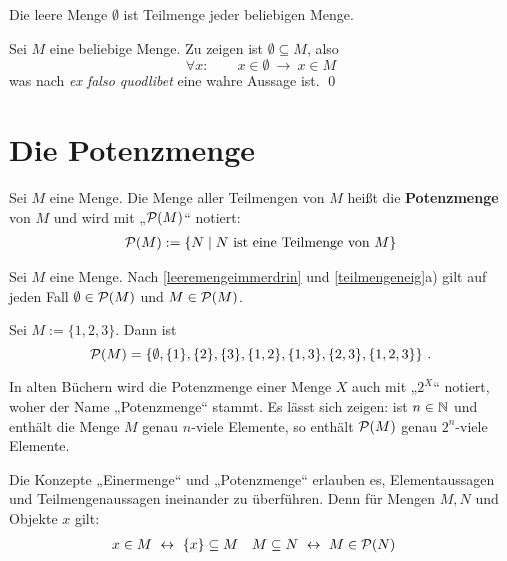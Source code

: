 \begin{satz} \label{leeremengeimmerdrin}
    Die leere Menge $\emptyset$ ist Teilmenge jeder beliebigen Menge.
\end{satz}


\begin{bew}
    Sei $M$ eine beliebige Menge. Zu zeigen ist $\emptyset\subseteq M$, also
        \[ \forall x:\qquad x\in \emptyset\ \to\ x\in M \]
    was nach \emph{ex falso quodlibet} eine wahre Aussage ist. \qed
\end{bew}





\section{Die Potenzmenge}


\begin{de}[Potenzmenge] \label{def:potenzmenge} 
    Sei $M$ eine Menge. Die Menge aller Teilmengen von $M$ heißt die \textbf{Potenzmenge} von $M$ und wird mit „$\mathcal P(M)$“ notiert:
    \begin{align*}
        \mathcal P(M) := \{N \mid N \ \text{ist eine Teilmenge von $M$} \}
    \end{align*}
\end{de}


\begin{bem}
    Sei $M$ eine Menge. Nach \cref{leeremengeimmerdrin} und \cref{teilmengeneig}a) gilt auf jeden Fall $\emptyset\in \mathcal P(M)$ und $M\in \mathcal P(M)$.
\end{bem}


\begin{bsp} \label{bsp:potenzmenge}
    Sei $M:=\{1,2,3\}$. Dann ist
        \[ \mathcal P(M)=\left\{\emptyset,\{1\},\{2\},\{3\},\{1,2\},\{1,3\},\{2,3\},\{1,2,3\}\right\}\,. \]
\end{bsp}


\noindent In alten Büchern wird die Potenzmenge einer Menge $X$ auch mit „$2^X$“ notiert, woher der Name „Potenzmenge“ stammt. Es lässt sich zeigen: ist $n\in \mathbb N$ und enthält die Menge $M$ genau $n$-viele Elemente, so enthält $\mathcal P(M)$ genau $2^n$-viele Elemente.


\begin{bem}
    Die Konzepte „Einermenge“ und „Potenzmenge“ erlauben es, Elementaussagen und Teilmengenaussagen ineinander zu überführen. Denn für Mengen $M,N$ und Objekte $x$ gilt:
    \begin{align*}
        x\in M\ & \leftrightarrow\ \{x\}\subseteq M & M\subseteq N\ &\leftrightarrow\ M\in \mathcal P(N)
    \end{align*}
\end{bem}


